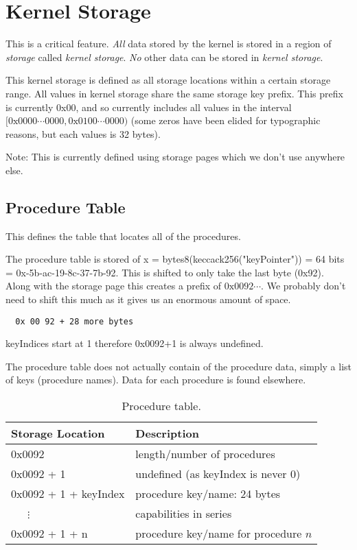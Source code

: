 \documentclass[english,a4paper]{article}
\begin{document}
\section{Kernel Storage}\label{kernel-storage}
This is a critical feature. \emph{All} data stored by the kernel is stored in a
region of \emph{storage} called \emph{kernel storage}. \emph{No} other data can
be stored in \emph{kernel storage}.

This kernel storage is defined as all storage locations within a certain storage
range. All values in kernel storage share the same storage key prefix. This
prefix is currently 0x00, and so currently includes all values in the interval
$[0\text{x}0000 \cdots 0000, 0\text{x}0100 \cdots 0000)$ (some zeros have been
elided for typographic reasons, but each values is 32 bytes).

Note: This is currently defined using storage pages which we don't use anywhere
else.

\subsection{Procedure Table}\label{procedure-table}
This defines the table that locates all of the procedures.

The procedure table is stored of x = bytes8(keccack256("keyPointer")) = 64 bits
= 0x-5b-ac-19-8c-37-7b-92. This is shifted to only take the last byte
(0x92). Along with the storage page this creates a prefix of ${0\text{x} 00 92 \cdots
}$. We probably don't need to shift this much as it gives us an enormous amount
of space.

\begin{verbatim}
  0x 00 92 + 28 more bytes
\end{verbatim}

keyIndices start at 1 therefore 0x0092+1 is always undefined.

The procedure table does not actually contain of the procedure data, simply a
list of keys (procedure names). Data for each procedure is found elsewhere.

\begin{table}[H]
  \caption{Procedure table.}
  \centering{}%
  \begin{tabular}{l|p{}}
    \hline
    Storage Location & Description\tabularnewline
    \hline
    \hline
    0x0092     & length/number of procedures \tabularnewline
    0x0092 + 1 & undefined (as keyIndex is never 0) \tabularnewline
    0x0092 + 1 + keyIndex & procedure key/name: 24 bytes \tabularnewline
    ~~~$\vdots$ & capabilities in series \tabularnewline
    0x0092 + 1 + n & procedure key/name for procedure $n$ \tabularnewline
    \hline
  \end{tabular}
\end{table}
\end{document}
